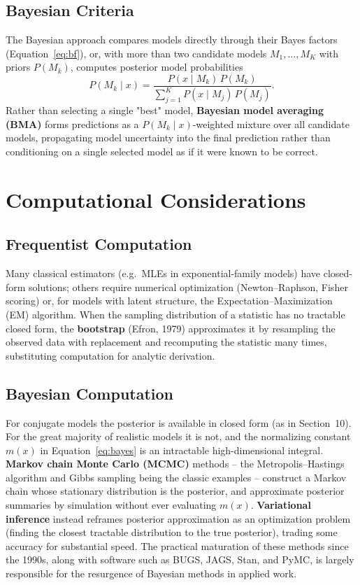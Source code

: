 \documentclass[11pt,a4paper]{article}
\begin{document}
\subsection{Bayesian Criteria}
The Bayesian approach compares models directly through their Bayes factors (Equation~\eqref{eq:bf}), or, with more than two candidate models $M_1, \dots, M_K$ with priors $P(M_k)$, computes posterior model probabilities
\begin{equation}
P(M_k \mid x) = \frac{P(x \mid M_k)\, P(M_k)}{\sum_{j=1}^K P(x \mid M_j)\, P(M_j)}.
\end{equation}
Rather than selecting a single "best" model, \textbf{Bayesian model averaging (BMA)} forms predictions as a $P(M_k\mid x)$-weighted mixture over all candidate models, propagating model uncertainty into the final prediction rather than conditioning on a single selected model as if it were known to be correct.

\section{Computational Considerations}

\subsection{Frequentist Computation}
Many classical estimators (e.g.\ MLEs in exponential-family models) have closed-form solutions; others require numerical optimization (Newton--Raphson, Fisher scoring) or, for models with latent structure, the Expectation--Maximization (EM) algorithm. When the sampling distribution of a statistic has no tractable closed form, the \textbf{bootstrap} (Efron, 1979) approximates it by resampling the observed data with replacement and recomputing the statistic many times, substituting computation for analytic derivation.

\subsection{Bayesian Computation}
For conjugate models the posterior is available in closed form (as in Section~10). For the great majority of realistic models it is not, and the normalizing constant $m(x)$ in Equation~\eqref{eq:bayes} is an intractable high-dimensional integral. \textbf{Markov chain Monte Carlo (MCMC)} methods -- the Metropolis--Hastings algorithm and Gibbs sampling being the classic examples -- construct a Markov chain whose stationary distribution is the posterior, and approximate posterior summaries by simulation without ever evaluating $m(x)$. \textbf{Variational inference} instead reframes posterior approximation as an optimization problem (finding the closest tractable distribution to the true posterior), trading some accuracy for substantial speed. The practical maturation of these methods since the 1990s, along with software such as BUGS, JAGS, Stan, and PyMC, is largely responsible for the resurgence of Bayesian methods in applied work.
\end{document}
